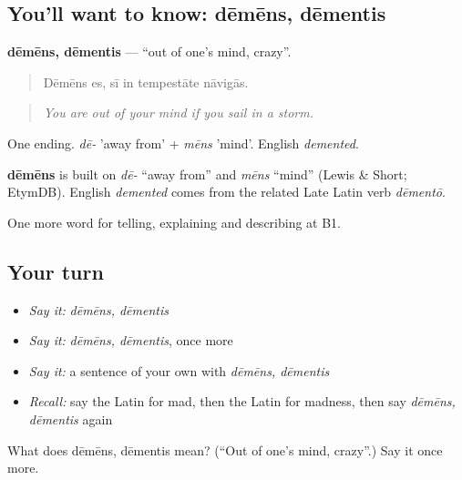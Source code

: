 \subsection*{You'll want to know: dēmēns, dēmentis}
\textbf{dēmēns, dēmentis} — \textquotedblleft{}out of one's mind, crazy\textquotedblright{}.

\begin{quote}
Dēmēns es, sī in tempestāte nāvigās.
\end{quote}

\begin{quote}
\emph{You are out of your mind if you sail in a storm.}
\end{quote}

One ending. \emph{dē-} 'away from' + \emph{mēns} 'mind'. English \emph{demented}.

\begin{cousinweb}
\textbf{dēmēns} is built on \emph{dē-} \textquotedblleft{}away from\textquotedblright{} and \emph{mēns} \textquotedblleft{}mind\textquotedblright{} (Lewis \& Short; EtymDB). English \emph{demented} comes from the related Late Latin verb \emph{dēmentō}.
\end{cousinweb}

\begin{grammarlens}[title={What you've built}]
One more word for telling, explaining and describing at B1.
\end{grammarlens}

\subsection*{Your turn}
\begin{itemize}
\raggedright
  \item \emph{Say it:} \emph{dēmēns, dēmentis}
  \item \emph{Say it:} \emph{dēmēns, dēmentis}, once more
  \item \emph{Say it:} a sentence of your own with \emph{dēmēns, dēmentis}
  \item \emph{Recall:} say the Latin for mad, then the Latin for madness, then say \emph{dēmēns, dēmentis} again
\end{itemize}

\begin{tcolorbox}[breakable,colback=teal!4,colframe=teal!35!black,title={Before you move on}]
What does dēmēns, dēmentis mean? (\textquotedblleft{}Out of one's mind, crazy\textquotedblright{}.) Say it once more.
\end{tcolorbox}
